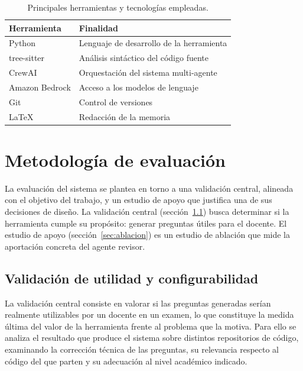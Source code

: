 \begin{table}[htbp]
  \centering
  \caption{Principales herramientas y tecnologías empleadas.}
  \label{tab:herramientas}
  \begin{tabular}{ll}
    \toprule
    Herramienta & Finalidad \\
    \midrule
    Python        & Lenguaje de desarrollo de la herramienta \\
    tree-sitter   & Análisis sintáctico del código fuente \\
    CrewAI        & Orquestación del sistema multi-agente \\
    Amazon Bedrock & Acceso a los modelos de lenguaje \\
    Git           & Control de versiones \\
    \LaTeX        & Redacción de la memoria \\
    \bottomrule
  \end{tabular}
\end{table}


\section{Metodología de evaluación}
\label{sec:metodologia-evaluacion}

La evaluación del sistema se plantea en torno a una validación central,
alineada con el objetivo del trabajo, y un estudio de apoyo que justifica
una de sus decisiones de diseño. La validación central
(sección~\ref{sec:validacion-utilidad}) busca determinar si la
herramienta cumple su propósito: generar preguntas útiles para el
docente. El estudio de apoyo (sección~\ref{sec:ablacion}) es un estudio
de ablación que mide la aportación concreta del agente revisor.

\subsection{Validación de utilidad y configurabilidad}
\label{sec:validacion-utilidad}

La validación central consiste en valorar si las preguntas generadas
serían realmente utilizables por un docente en un examen, lo que
constituye la medida última del valor de la herramienta frente al
problema que la motiva. Para ello se analiza el resultado que produce el
sistema sobre distintos repositorios de código, examinando la
corrección técnica de las preguntas, su relevancia respecto al código
del que parten y su adecuación al nivel académico indicado.


